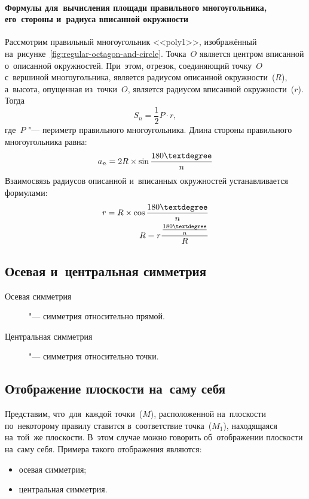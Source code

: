 \documentclass[]{scrartcl}
\begin{document}
\paragraph{Формулы для~вычисления площади правильного многоугольника, его~стороны и~радиуса вписанной окружности}\label{regular-polygon-square-sides-radius}
Рассмотрим правильный многоугольник <<poly1>>, изображённый на~рисунке~\ref{fig:regular-octagon-and-circle}. Точка~${\textstyle O}$ является центром вписанной о~описанной окружностей. При~этом, отрезок, соединяющий точку~${\textstyle O}$ с~вершиной многоугольника, является радиусом описанной окружности~(${\textstyle R}$), а~высота, опущенная из~точки~${\textstyle O}$, является радиусом вписанной окружности~(${\textstyle r}$). Тогда
\begin{equation}\label{eq:regular-polygon-square}
S_{n}=\frac{1}{2}P\cdot r,
\end{equation}
где~${\textstyle P}$ "--- периметр правильного многоугольника.
Длина стороны правильного многоугольника равна:
\begin{equation}\label{eq:side-of-regular-polygon}
a_{n}=2R \times \sin \frac{180 \textdegree}{n}
\end{equation}
Взаимосвязь радиусов описанной и~вписанных окружностей устанавливается формулами:
\begin{equation}\label{eq:regular-polygon-R-r}
\begin{aligned}
r = R \times \cos \frac{180 \textdegree}{n}\\
R = r \dfrac{\frac{180 \textdegree}{n}}{R}
\end{aligned}
\end{equation}



\subsection{Осевая и~центральная симметрия}
\begin{description}
	\item[Осевая симметрия] "--- симметрия относительно прямой.
\end{description}

\begin{description}
	\item[Центральная симметрия] "--- симметрия относительно точки.
\end{description} 

\subsection{Отображение плоскости на~саму себя}
Представим, что~для~каждой точки~(${\textstyle M}$), расположенной на~плоскости по~некоторому правилу ставится в~соответствие точка~(${\textstyle M_{1}}$), находящаяся на~той~же плоскости. В~этом случае можно говорить об~отображении плоскости на~саму себя. Примера такого отображения являются:
\begin{itemize}
	\item осевая симметрия;
	\item центральная симметрия.
\end{itemize}
\end{document}
